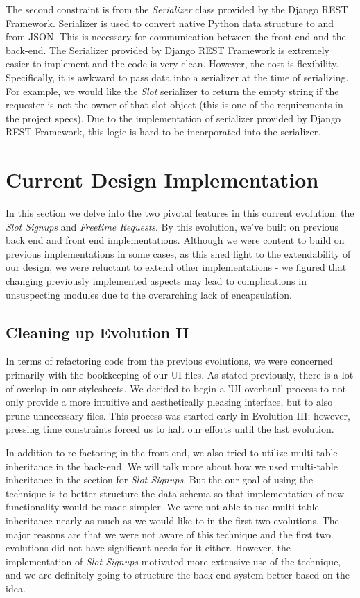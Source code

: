 \documentclass[a4paper]{article}
\begin{document}
The second constraint is from the \emph{Serializer} class provided by the Django REST Framework. Serializer is used to convert native Python data structure to and from JSON. This is necessary for communication between the front-end and the back-end. The Serializer provided by Django REST Framework is extremely easier to implement and the code is very clean. However, the cost is flexibility. Specifically, it is awkward to pass data into a serializer at the time of serializing. For example, we would like the \emph{Slot} serializer to return the empty string if the requester is not the owner of that slot object (this is one of the requirements in the project specs). Due to the implementation of serializer provided by Django REST Framework, this logic is hard to be incorporated into the serializer. 


\section{Current Design Implementation}
In this section we delve into the two pivotal features in this current evolution: the \textit{Slot Signups} and \textit{Freetime Requests}. By this evolution, we've built on previous back end and front end implementations. Although we were content to build on previous implementations in some cases, as this shed light to the extendability of our design, we were reluctant to extend other implementations - we figured that changing previously implemented aspects may lead to complications in unsuspecting modules due to the overarching lack of encapsulation. 


\subsection{Cleaning up Evolution II}

In terms of refactoring code from the previous evolutions, we were concerned primarily with the bookkeeping of our UI files. As stated previously, there is a lot of overlap in our stylesheets. We decided to begin a 'UI overhaul' process to not only provide a more intuitive and aesthetically pleasing interface, but to also prune unnecessary files. This process was started early in Evolution III; however, pressing time constraints forced us to halt our efforts until the last evolution.

In addition to re-factoring in the front-end, we also tried to utilize multi-table inheritance in the back-end. We will talk more about how we used multi-table inheritance in the section for \emph{Slot Signups}. But the our goal of using the technique is to better structure the data schema so that implementation of new functionality would be made simpler. We were not able to use multi-table inheritance nearly as much as we would like to in the first two evolutions. The major reasons are that we were not aware of this technique and the first two evolutions did not have significant needs for it either. However, the implementation of \emph{Slot Signups} motivated more extensive use of the technique, and we are definitely going to structure the back-end system better based on the idea.
\end{document}
